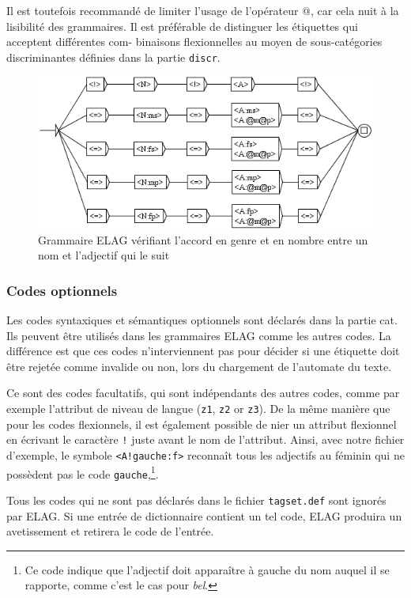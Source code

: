\bigskip
\noindent Il est toutefois recommandé de limiter l’usage de l’opérateur @, car cela nuit à la lisibilité
des grammaires. Il est préférable de distinguer les étiquettes qui acceptent différentes com-
binaisons flexionnelles au moyen de sous-catégories discriminantes définies dans la partie
\verb$discr$.

\begin{figure}[!ht]
\begin{center}
\includegraphics[width=12cm]{resources/img/fig7-19.png}
\caption{Grammaire ELAG vérifiant l’accord en genre et en nombre entre un nom et l’adjectif qui le suit
\label{fig-NA}}
\end{center}
\end{figure}

\subsubsection{Codes optionnels}
Les codes syntaxiques et sémantiques optionnels sont déclarés dans la partie cat. Ils
peuvent être utilisés dans les grammaires ELAG comme les autres codes. La différence est
que ces codes n’interviennent pas pour décider si une étiquette doit être rejetée comme
invalide ou non, lors du chargement de l’automate du texte.


\bigskip
\noindent Ce sont des codes facultatifs, qui sont indépendants des autres codes, 
comme par exemple l’attribut de niveau de langue (\verb$z1$, \verb$z2$ or \verb$z3$). 
De la même manière que pour les codes flexionnels, il est également possible de nier
un attribut flexionnel en écrivant le caractère \verb$!$ juste avant le nom de l’attribut.
Ainsi, avec notre fichier d’exemple, le symbole \verb$<A!gauche:f>$ reconnaît tous les
adjectifs au féminin qui ne possèdent pas le code \verb$gauche$,\footnote{Ce code indique 
que l’adjectif doit apparaître à gauche du nom auquel il se rapporte, comme c’est le cas
pour \textit{bel}.}.

\bigskip
\noindent Tous les codes qui ne sont pas déclarés dans le fichier
\verb$tagset.def$ sont ignorés par ELAG. Si une entrée de
dictionnaire contient un tel code, ELAG produira un avetissement et retirera le code de l’entrée.


